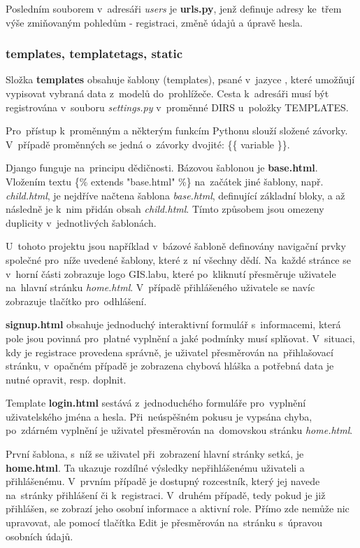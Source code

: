 Posledním souborem v~adresáři \textit{users} je \textbf{urls.py}, jenž
definuje  adresy ke~třem výše zmiňovaným pohledům -
registraci, změně údajů a úpravě hesla.

\subsubsection{templates, templatetags, static}
Složka \textbf{templates} obsahuje šablony (templates), psané v~jazyce
, které umož\-ňují vypisovat vybraná data z~modelů 
do~prohlížeče. Cesta k~adresáři musí být registrována v~souboru
\textit{settings.py} v~proměnné \textsf{DIRS} u~položky
\textsf{TEMPLATES}.

Pro~přístup k~proměnným a některým funkcím Pythonu slouží složené
závorky. V~případě proměnných se jedná o~závorky dvojité: \textsf{\{\{
  variable \}\}}.

Django funguje na~principu dědičnosti. Bázovou šablonou je
\textbf{base.html}. Vlože\-ním textu \textsf{\{\% extends "base.html"
  \%\}} na~začátek jiné šablony, např. \textit{child.html}, je
nejdříve načtena šablona \textit{base.html}, definující základní
bloky, a až následně je k~nim přidán obsah \textit{child.html}. Tímto
způsobem jsou omezeny duplicity v~jednotlivých šablonách.

U~tohoto projektu jsou například v~bázové šabloně definovány navigační
prvky společné pro~níže uvedené šablony, které z~ní všechny dědí. 
Na~každé stránce se v~horní části zobrazuje logo GIS.labu, které 
po~kliknutí přesměruje uživatele na~hlavní stránku \textit{home.html}. 
V~případě přihlášeného uživatele se navíc zobrazuje tlačítko 
pro~odhlášení.

\textbf{signup.html} obsahuje jednoduchý interaktivní formulář 
s~informacemi, která pole jsou povinná pro~platné vyplnění a jaké
podmínky musí splňovat. V~situaci, kdy je registrace provedena
správně, je uživatel přesměrován na~přihlašovací stránku, v~opačném
případě je zobrazena chybová hláška a potřebná data je nutné opravit,
resp. doplnit.

Template \textbf{login.html} sestává z~jednoduchého formuláře 
pro~vyplnění uživatelského jména a hesla. Při~neúspěšném pokusu je vypsána
chyba, po~zdárném vyplnění je uživatel přesměrován na~domovskou
stránku \textit{home.html}.

První šablona, s~níž se uživatel při~zobrazení hlavní stránky setká,
je \textbf{home.html}. Ta ukazuje rozdílné výsledky nepřihlášenému
uživateli a přihlášenému. V~prvním případě je dostupný rozcestník,
který jej navede na~stránky přihlášení či k~registraci. V~druhém
případě, tedy pokud je již přihlášen, se zobrazí jeho osobní informace
a aktivní role. Přímo zde nemůže nic upravovat, ale pomocí tlačítka
\textsf{Edit} je přesměrován na~stránku s~úpravou osobních údajů.

